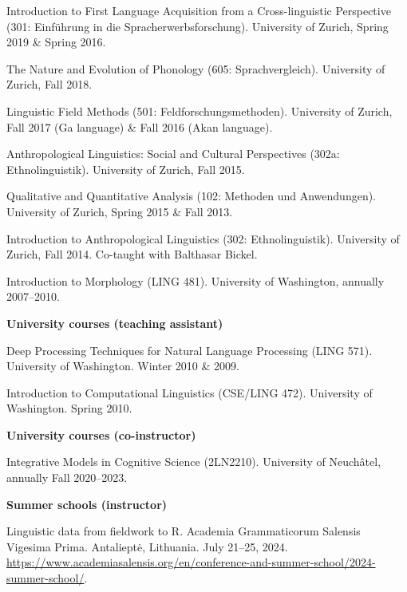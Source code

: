 \documentclass[11pt]{article}
\newcommand{\hangpara}{
 \setlength{\parindent}{0in} %
 \hangindent=0.42in %
}
\begin{document}
\vskip 6pt
\hangpara Introduction to First Language Acquisition from a Cross-linguistic Perspective (301: Einf{\"u}hrung in die Spracherwerbsforschung). University of Zurich, Spring 2019 \& Spring 2016.

\vskip 6pt
\hangpara The Nature and Evolution of Phonology (605: Sprachvergleich). University of Zurich, Fall 2018.

\vskip 6pt
\hangpara Linguistic Field Methods (501: Feldforschungsmethoden). University of Zurich, Fall 2017 (Ga language) \& Fall 2016 (Akan language).

\vskip 6pt
\hangpara Anthropological Linguistics: Social and Cultural Perspectives (302a: Ethnolinguistik). University of Zurich, Fall 2015.

\vskip 6pt
\hangpara Qualitative and Quantitative Analysis (102: Methoden und Anwendungen). University of Zurich, Spring 2015 \& Fall 2013.

\vskip 6pt
\hangpara Introduction to Anthropological Linguistics (302: Ethnolinguistik). University of Zurich, Fall 2014. Co-taught with Balthasar Bickel.

\vskip 6pt
\hangpara Introduction to Morphology (LING 481). University of Washington, annually 2007--2010.


\begin{flushleft}
{\bf University courses (teaching assistant)}
\end{flushleft}
\hangpara Deep Processing Techniques for Natural Language Processing (LING 571). University of Washington. Winter 2010 \& 2009.

\vskip 6pt
\hangpara %
Introduction to Computational Linguistics (CSE/LING 472). University of Washington. Spring 2010.


\begin{flushleft}
{\bf University courses (co-instructor)}
\end{flushleft}
\hangpara Integrative Models in Cognitive Science (2LN2210). University of Neuchâtel, annually Fall 2020--2023.


\begin{flushleft}
{\bf Summer schools (instructor)}
\end{flushleft}


\hangpara Linguistic data from fieldwork to R. Academia Grammaticorum Salensis Vigesima Prima. Antalieptė, Lithuania. July 21--25, 2024. \url{https://www.academiasalensis.org/en/conference-and-summer-school/2024-summer-school/}.
\end{document}
